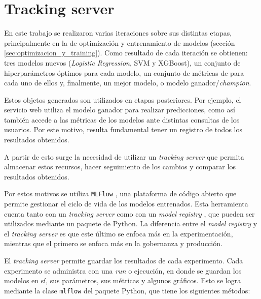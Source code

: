\section{Tracking server}

En este trabajo se realizaron varias iteraciones sobre sus distintas etapas, principalmente en la de optimización y entrenamiento de modelos (sección \ref{sec:optimizacion_y_training}). Como resultado de cada iteración se obtienen: tres modelos nuevos (\textit{Logistic Regression}, SVM y XGBoost), un conjunto de hiperparámetros óptimos para cada modelo, un conjunto de métricas de para cada uno de ellos y, finalmente, un mejor modelo, o modelo ganador/\textit{champion}.

Estos objetos generados son utilizados en etapas posteriores. Por ejemplo, el servicio web utiliza el modelo ganador para realizar predicciones, como así también accede a las métricas de los modelos ante distintas consultas de los usuarios. Por este motivo, resulta fundamental tener un registro de todos los resultados obtenidos.

A partir de esto surge la necesidad de utilizar un \textit{tracking server} que permita almacenar estos recursos, hacer seguimiento de los cambios y comparar los resultados obtenidos.

Por estos motivos se utiliza \texttt{MLFlow} \citep{WEBSITE:mlflow}, una plataforma de código abierto que permite gestionar el ciclo de vida de los modelos entrenados. Esta herramienta cuenta tanto con un \textit{tracking server} \citep{WEBSITE:mlflow_tracking_server} como con un \textit{model registry} \citep{WEBSITE:mlflow_model_registry}, que pueden ser utilizados mediante un paquete de Python. La diferencia entre el \textit{model registry} y el \textit{tracking server} es que este último se enfoca más en la experimentación, mientras que el primero se enfoca más en la gobernanza y producción.

El \textit{tracking server} permite guardar los resultados de cada experimento. Cada experimento se administra con una \textit{run} o ejecución, en donde se guardan los modelos en sí, sus parámetros, sus métricas y algunos gráficos. Esto se logra mediante la clase \texttt{mlflow} \citep{WEBSITE:mlflow_api} del paquete Python, que tiene los siguientes métodos:

